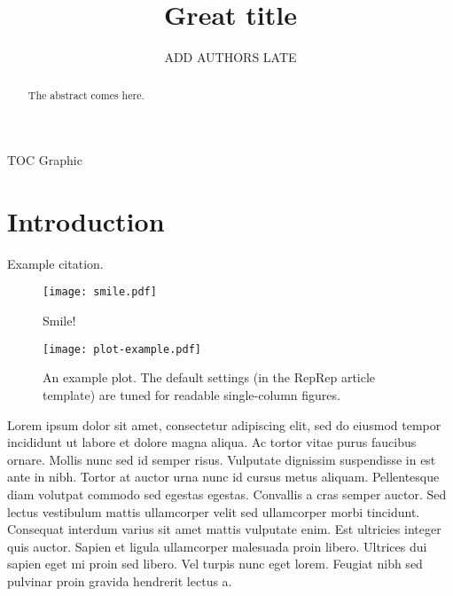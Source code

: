 \documentclass[journal=jctcce,manuscript=article,layout=traditional,]{achemso}
\title{Great title}
\author{ADD AUTHORS LATE}
\affiliation[Ghent University]{Center for Molecular Modeling (CMM), Ghent University, Technologiepark-Zwijnaarde 46, B-9052, Ghent, Belgium}
\begin{document}
    \begin{abstract}
         The abstract comes here.
    \end{abstract}

    \begin{tocentry}
        TOC Graphic
    \end{tocentry}

    \newpage
    \linenumbers

    \section{Introduction}
    \label{sec:introduction}

    Example citation.\cite{knuth:1984}

    \begin{figure}
        \begin{center}
            \texttt{[image: smile.pdf]}
        \end{center}
        \caption{Smile!}
        \label{fig:smile}
    \end{figure}

    \begin{figure}
        \begin{center}
            \texttt{[image: plot-example.pdf]}
        \end{center}
        \caption{
            An example plot.
            The default settings (in the RepRep article template)
            are tuned for readable single-column figures.
        }
        \label{fig:plot-example}
    \end{figure}

    Lorem ipsum dolor sit amet, consectetur adipiscing elit, sed do eiusmod tempor incididunt ut labore et dolore magna aliqua.
    Ac tortor vitae purus faucibus ornare.
    Mollis nunc sed id semper risus.
    Vulputate dignissim suspendisse in est ante in nibh.
    Tortor at auctor urna nunc id cursus metus aliquam.
    Pellentesque diam volutpat commodo sed egestas egestas.
    Convallis a cras semper auctor.
    Sed lectus vestibulum mattis ullamcorper velit sed ullamcorper morbi tincidunt.
    Consequat interdum varius sit amet mattis vulputate enim.
    Est ultricies integer quis auctor.
    Sapien et ligula ullamcorper malesuada proin libero.
    Ultrices dui sapien eget mi proin sed libero.
    Vel turpis nunc eget lorem.
    Feugiat nibh sed pulvinar proin gravida hendrerit lectus a.
\end{document}
